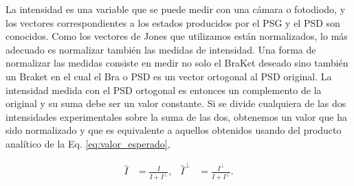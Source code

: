 La intensidad es una variable que se puede medir con una cámara o fotodiodo, y los vectores
correspondientes a los estados producidos por el PSG y el PSD son
conocidos. Como los vectores de Jones que utilizamos están
normalizados, lo más adecuado es normalizar también las medidas de
intensidad. Una forma de normalizar las medidas consiste en medir no
solo el BraKet deseado sino también un Braket en el cual el Bra o PSD es un
vector ortogonal al PSD original.  La intensidad medida con el PSD
ortogonal es entonces un complemento de la original y su suma debe ser
un valor constante. Si se divide cualquiera de las dos intensidades experimentales
sobre la suma de las dos, obtenemos un valor que ha sido
normalizado y que es equivalente a aquellos obtenidos usando del producto
analítico de la Eq. \ref{eq:valor_esperado}, 

\begin{align*}
\hat{I} &= \frac{I}{I+I^{\perp}},&\hat{I}^{\perp} &= \frac{I^{\perp}}{I+I^{\perp}}.
\end{align*}

